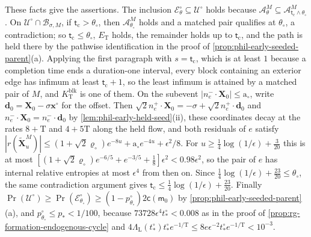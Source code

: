 These facts give the assertions. The inclusion
\(\mathscr E^\circ_\theta\subseteq\mathscr U^\circ\) holds because
\(\mathscr A^M_\theta\subseteq\mathscr A^M_{\mathsf t_{\mathrm c}\wedge\theta_\circ}\).
On \(\mathscr U^\circ\cap\mathscr B_{\sigma,M}\), if
\(\mathsf t_{\mathrm c}>\theta_\circ\), then \(\mathscr A^M_{\theta_\circ}\)
holds and a matched pair qualifies at \(\theta_\circ\), a contradiction; so
\(\mathsf t_{\mathrm c}\le\theta_\circ\), \(E_{\mathrm T}\) holds, the
remainder holds up to \(\mathsf t_{\mathrm c}\), and the path is held there by
the pathwise identification in the proof of
\cref{prop:phil-early-seeded-parent}(a). Applying the first paragraph with
\(s=\mathsf t_{\mathrm c}\), which is at least \(1\) because a completion time
ends a duration-one interval, every block containing an exterior edge has
infimum at least \(\mathsf t_{\mathrm c}+1\), so the least infimum is attained
by a matched pair of \(M\), and \(K^{\mathrm{blk}}_{\mathrm T}\) is one of them. On the
subevent \(|n^-_e\cdot\mathbf X_0|\le\mathrm a_\circ\), write
\(\mathbf d_0=\mathbf X_0-\sigma\mathbf x^\circ\) for the offset. Then
\(\sqrt2n^+_e\cdot\mathbf X_0=-\sigma+\sqrt2n^+_e\cdot\mathbf d_0\) and
\(n^-_e\cdot\mathbf X_0=n^-_e\cdot\mathbf d_0\) by
\cref{lem:phil-early-held-seed}(ii), these coordinates decay at the rates
\(8+\mathrm T\) and \(4+5\mathrm T\) along the held flow, and both residuals
of \(e\) satisfy
\(|r(\widetilde{\mathbf X}^M_u)|\le(1+\sqrt2\varrho_\circ)e^{-8u}
+\mathrm a_\circ e^{-4u}+\epsilon^2/8\). For
\(u\ge\frac14\log(1/\epsilon)+\frac3{20}\) this is at most
\([(1+\sqrt2\varrho_\circ)e^{-6/5}+e^{-3/5}+\frac18]\epsilon^2<0.98\epsilon^2\),
so the pair of \(e\) has internal relative entropies at most \(\epsilon^4\)
from then on. Since \(\frac14\log(1/\epsilon)+\frac{23}{20}\le\theta_\circ\),
the same contradiction argument gives
\(\mathsf t_{\mathrm c}\le\frac14\log(1/\epsilon)+\frac{23}{20}\). Finally
\(\Pr(\mathscr U^\circ)\ge\Pr(\mathscr E^\circ_{\theta_\circ})
\ge(1-p^\circ_{\theta_\circ})2\mathsf c(\mathsf m_0)\) by
\cref{prop:phil-early-seeded-parent}(a), and \(p^\circ_{\theta_\circ}\le
p_*<1/100\), because \(73728\epsilon^4t^\circ_*<0.008\) as in the proof of
\cref{prop:rg-formation-endogenous-cycle} and
\(4\Lambda_{\mathrm L}(t^\circ_*)t^\circ_*e^{-1/\mathrm T}
\le8e\epsilon^{-2}t^\circ_*e^{-1/\mathrm T}<10^{-3}\).

